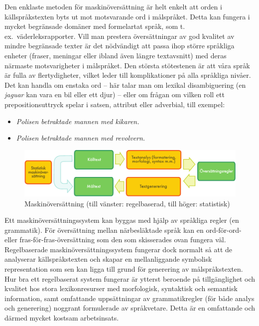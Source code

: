 \begin{multicols}{2}
Den enklaste metoden för maskin\-över\-sätt\-ning är helt enkelt att orden i
källspråkstexten byts ut mot motsvarande ord i målspråket. Detta kan
fungera i mycket begränsade domäner med formelartat språk, som
t.\,ex.~väderleksrapporter. Vill man prestera översättningar av god
kvalitet av mindre begränsade texter är det nödvändigt att passa ihop
större språkliga enheter (fraser, meningar eller ibland även längre
textavsnitt) med deras närmaste motsvarigheter i målspråket. Den
största stötestenen är att våra språk är fulla av flertydigheter,
vilket leder till komplikationer på alla språkliga nivåer. Det kan
handla om enstaka ord -- här talar man om lexikal disambiguering (en
\textit{jaguar} kan vara en bil eller ett djur) -- eller om
frågan om vilken roll ett prepositionsuttryck spelar i satsen,
attribut eller adverbial, till exempel:

\begin{itemize}
\item \textit{Polisen betraktade mannen med kikaren.}
\item \textit{Polisen betraktade mannen med revolvern.}
\end{itemize}

\begin{figure}[htb]
  \center
  \includegraphics[width=\textwidth]{../_media/swedish/machine_translation}
  \caption{Maskinöversättning (till vänster: regelbaserad, till höger:
    statistisk)}
  \label{fig:mtarch_sv}
\end{figure}

Ett maskin\-över\-sätt\-nings\-system kan byggas med hjälp av språkliga regler
(en grammatik). För översättning mellan närbesläktade språk kan en
ord-för-ord- eller fras-för-fras-översättning som den som skisserades
ovan fungera väl. Regelbaserade maskin\-över\-sätt\-nings\-system fungerar
dock normalt så att de analyserar källspråkstexten och skapar en
mellanliggande symbolisk representation som sen kan ligga till grund
för generering av målspråkstexten. Hur bra ett regelbaserat system
fungerar är ytterst beroende på tillgänglighet och kvalitet hos stora
lexikonresurser med morfologisk, syntaktisk och semantisk information,
samt omfattande uppsättningar av grammatikregler (för både analys och
generering) noggrant formulerade av språkvetare. Detta är en
omfattande och därmed mycket kostsam arbetsinsats.


\end{multicols}
